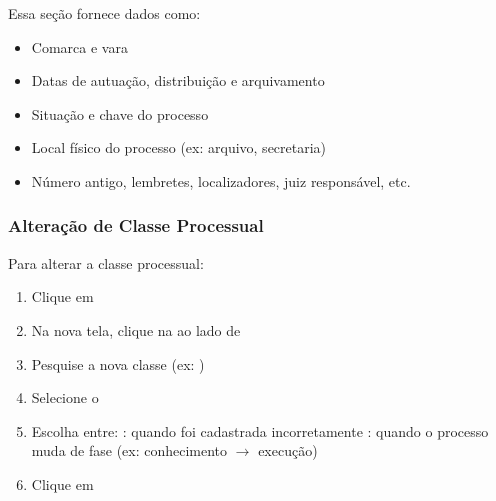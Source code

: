 \documentclass[letterpaper,10pt,brazil]{sphinxmanual}
\begin{document}
\sphinxAtStartPar
Essa seção fornece dados como:
\begin{itemize}
\item {} 
\sphinxAtStartPar
Comarca e vara

\item {} 
\sphinxAtStartPar
Datas de autuação, distribuição e arquivamento

\item {} 
\sphinxAtStartPar
Situação e chave do processo

\item {} 
\sphinxAtStartPar
Local físico do processo (ex: arquivo, secretaria)

\item {} 
\sphinxAtStartPar
Número antigo, lembretes, localizadores, juiz responsável, etc.

\end{itemize}


\subsubsection{Alteração de Classe Processual}
\label{\detokenize{projud_19_evolucao_retificacao:alteracao-de-classe-processual}}
\sphinxAtStartPar
Para alterar a classe processual:
\begin{enumerate}
%
\item {} 
\sphinxAtStartPar
Clique em 

\item {} 
\sphinxAtStartPar
Na nova tela, clique na  ao lado de 

\item {} 
\sphinxAtStartPar
Pesquise a nova classe (ex: )

\item {} 
\sphinxAtStartPar
Selecione o 

\item {} 
\sphinxAtStartPar
Escolha entre:
\sphinxhyphen{} : quando foi cadastrada incorretamente
\sphinxhyphen{} : quando o processo muda de fase (ex: conhecimento \(\rightarrow\) execução)

\item {} 
\sphinxAtStartPar
Clique em 

\end{enumerate}
\end{document}
